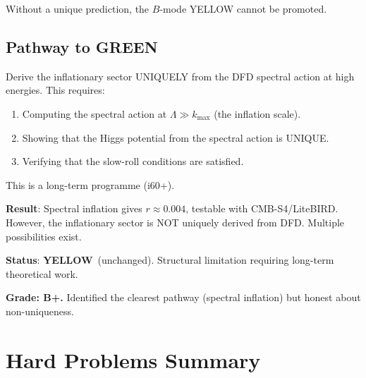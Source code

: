 \documentclass[11pt,a4paper]{article}
\newcommand{\YELLOW}{\textcolor{dfdyellow}{\textbf{YELLOW}}}
\begin{document}
Without a unique prediction, the $B$-mode YELLOW cannot be promoted.

\subsection{Pathway to GREEN}

Derive the inflationary sector UNIQUELY from the DFD spectral action at high energies. This requires:
\begin{enumerate}
\item Computing the spectral action at $\Lambda \gg k_{\max}$ (the inflation scale).
\item Showing that the Higgs potential from the spectral action is UNIQUE.
\item Verifying that the slow-roll conditions are satisfied.
\end{enumerate}

This is a long-term programme (i60+).

\begin{tcolorbox}[colback=yellow!5!white, colframe=yellow!60!black, title={Agent 12: $B$-Mode --- YELLOW (Structural, Long-Term)}]
\textbf{Result}: Spectral inflation gives $r \approx 0.004$, testable with CMB-S4/LiteBIRD. However, the inflationary sector is NOT uniquely derived from DFD. Multiple possibilities exist.

\textbf{Status}: \YELLOW\ (unchanged). Structural limitation requiring long-term theoretical work.

\textbf{Grade: B+.} Identified the clearest pathway (spectral inflation) but honest about non-uniqueness.
\end{tcolorbox}


\section*{Hard Problems Summary}
\end{document}
